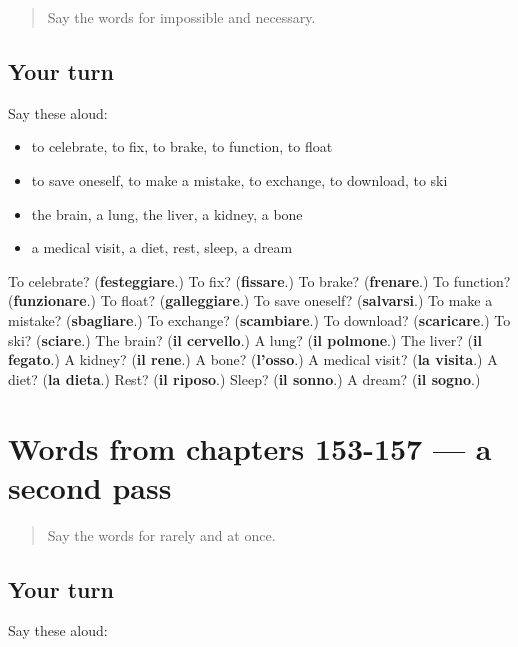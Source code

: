 \label{lesson:IT-R157-first-pass-words-from-chapters-149-152}



\begin{quote}
Say the words for impossible and necessary.
\end{quote}

\subsection*{Your turn}
Say these aloud:

\begin{itemize}
\raggedright
  \item to celebrate, to fix, to brake, to function, to float
  \item to save oneself, to make a mistake, to exchange, to download, to ski
  \item the brain, a lung, the liver, a kidney, a bone
  \item a medical visit, a diet, rest, sleep, a dream
\end{itemize}

\begin{tcolorbox}[breakable,colback=teal!4,colframe=teal!35!black,title={Before you move on}]
To celebrate? (\textbf{festeggiare}.) To fix? (\textbf{fissare}.) To brake? (\textbf{frenare}.) To function? (\textbf{funzionare}.) To float? (\textbf{galleggiare}.) To save oneself? (\textbf{salvarsi}.) To make a mistake? (\textbf{sbagliare}.) To exchange? (\textbf{scambiare}.) To download? (\textbf{scaricare}.) To ski? (\textbf{sciare}.) The brain? (\textbf{il cervello}.) A lung? (\textbf{il polmone}.) The liver? (\textbf{il fegato}.) A kidney? (\textbf{il rene}.) A bone? (\textbf{l'osso}.) A medical visit? (\textbf{la visita}.) A diet? (\textbf{la dieta}.) Rest? (\textbf{il riposo}.) Sleep? (\textbf{il sonno}.) A dream? (\textbf{il sogno}.)
\end{tcolorbox}
\section[(dialogue)]{Words from chapters 153-157 — a second pass}

\label{lesson:IT-R157-second-pass-words-from-chapters-153-157}



\begin{quote}
Say the words for rarely and at once.
\end{quote}

\subsection*{Your turn}
Say these aloud:

